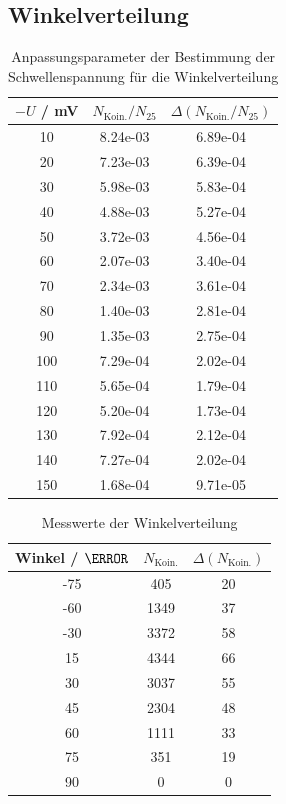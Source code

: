 \documentclass{article}
\begin{document}
\subsection*{Winkelverteilung}
\begin{table}[H]
    \centering
    \caption{Anpassungsparameter der Bestimmung der Schwellenspannung für die Winkelverteilung}
    \begin{tabular}{|c|c|c|}
        \hline
        $-U$ / mV & $N_\mathrm{Koin.}/N_{25}$ & $\Delta (N_\mathrm{Koin.}/N_{25})$ \\ \hline \hline
        10 & 8.24e-03 & 6.89e-04 \\ \hline
        20 & 7.23e-03 & 6.39e-04 \\ \hline
        30 & 5.98e-03 & 5.83e-04 \\ \hline
        40 & 4.88e-03 & 5.27e-04 \\ \hline
        50 & 3.72e-03 & 4.56e-04 \\ \hline
        60 & 2.07e-03 & 3.40e-04 \\ \hline
        70 & 2.34e-03 & 3.61e-04 \\ \hline
        80 & 1.40e-03 & 2.81e-04 \\ \hline
        90 & 1.35e-03 & 2.75e-04 \\ \hline
        100 & 7.29e-04 & 2.02e-04 \\ \hline
        110 & 5.65e-04 & 1.79e-04 \\ \hline
        120 & 5.20e-04 & 1.73e-04 \\ \hline
        130 & 7.92e-04 & 2.12e-04 \\ \hline
        140 & 7.27e-04 & 2.02e-04 \\ \hline
        150 & 1.68e-04 & 9.71e-05 \\ \hline
    \end{tabular}   
    \label{tab:LebensdauerRohdaten}
\end{table}

\begin{table}[H]
    \centering
    \caption{Messwerte der Winkelverteilung}
    \begin{tabular}{|c|c|c|}
        \hline
        Winkel / $\degree$ & $N_\mathrm{Koin.}$ & $\Delta (N_\mathrm{Koin.})$ \\ \hline \hline
        -75 & 405 & 20 \\ \hline
        -60 & 1349 & 37 \\ \hline
        -30 & 3372 & 58 \\ \hline
        15 & 4344 & 66 \\ \hline
        30 & 3037 & 55 \\ \hline
        45 & 2304 & 48 \\ \hline
        60 & 1111 & 33 \\ \hline
        75 & 351 & 19 \\ \hline
        90 & 0 & 0 \\ \hline
    \end{tabular}
    \label{tab:Winkelverteilung}
\end{table}
\end{document}
